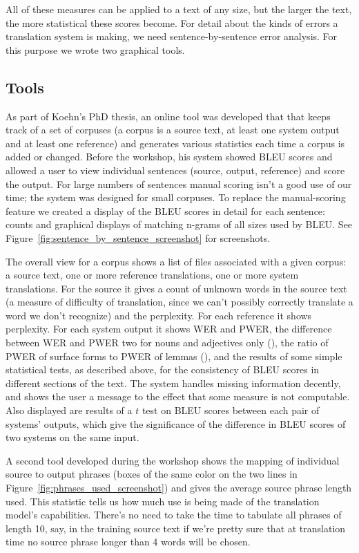 \documentclass[11pt]{report}
\theoremstyle{plain}
\begin{document}
{All of these measures can be applied to a text of any size, but the larger the text, the more statistical these scores become. For detail about the kinds of errors a translation system is making, we need sentence-by-sentence error analysis. For this purpose we wrote two graphical tools.

\subsection{Tools}
As part of Koehn's PhD thesis, an online tool was developed that that keeps track of a set of corpuses (a corpus is a source text, at least one system output and at least one reference) and generates various statistics each time a corpus is added or changed. Before the workshop, his system showed BLEU scores and allowed a user to view individual sentences (source, output, reference) and score the output. For large numbers of sentences manual scoring isn't a good use of our time; the system was designed for small corpuses. To replace the manual-scoring feature we created a display of the BLEU scores in detail for each sentence: counts and graphical displays of matching n-grams of all sizes used by BLEU. See Figure~\ref{fig:sentence_by_sentence_screenshot} for screenshots.

The overall view for a corpus shows a list of files associated with a given corpus: a source text, one or more reference translations, one or more system translations. For the source it gives a count of unknown words in the source text (a measure of difficulty of translation, since we can't possibly correctly translate a word we don't recognize) and the perplexity. For each reference it shows perplexity. For each system output it shows WER and PWER, the difference between WER and PWER two for nouns and adjectives only (\cite{errMeasures}), the ratio of PWER of surface forms to PWER of lemmas (\cite{errMeasures}), and the results of some simple statistical tests, as described above, for the consistency of BLEU scores in different sections of the text. The system handles missing information decently, and shows the user a message to the effect that some measure is not computable. Also displayed are results of a $t$ test on BLEU scores between each pair of systems' outputs, which give the significance of the difference in BLEU scores of two systems on the same input.

A second tool developed during the workshop shows the mapping of individual source to output phrases (boxes of the same color on the two lines in Figure~\ref{fig:phrases_used_screenshot}) and gives the average source phrase length used. This statistic tells us how much use is being made of the translation model's capabilities. There's no need to take the time to tabulate all phrases of length 10, say, in the training source text if we're pretty sure that at translation time no source phrase longer than 4 words will be chosen.

}
\end{document}
